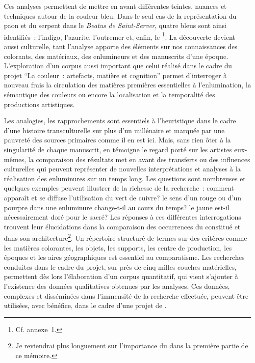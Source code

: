 Ces analyses permettent de mettre en avant différentes teintes, nuances et techniques autour de la couleur bleu. Dans le seul cas de la représentation du paon et du serpent dans le \textit{Beatus de Saint-Server}, quatre bleus sont ainsi identifiés~: l’indigo, l’azurite, l’outremer et, enfin, le \footnote{Cf. annexe 1.}. La découverte devient aussi culturelle, tant l’analyse apporte des éléments sur nos connaissances des colorants, des matériaux, des enlumineurs et des manuscrits d’une époque. L’exploration d’un corpus aussi important que celui réalisé dans le cadre du projet \enquote{La couleur~: artefacts, matière et cognition} permet d’interroger à nouveau frais la circulation des matières premières essentielles à l’enlumination, la sémantique des couleurs ou encore la localisation et la temporalité des productions artistiques. \par
Les analogies, les rapprochements sont essentiels à l’heuristique dans le cadre d’une histoire transculturelle sur plus d’un millénaire et marquée par une pauvreté des sources primaires comme il en est ici. Mais, sans rien ôter à la singularité de chaque manuscrit, en témoigne le regard porté sur les artistes eux-mêmes, la comparaison des résultats met en avant des transferts ou des influences culturelles qui peuvent représenter de nouvelles interprétations et analyses à la réalisation des enluminures sur un temps long. Les questions sont nombreuses et quelques exemples peuvent illustrer de la richesse de la recherche : comment apparaît et se diffuse l’utilisation du vert de cuivre? le sens d’un rouge ou d’un pourpre dans une enluminure change-t-il au cours du temps? le jaune est-il nécessairement doré pour le sacré? Les réponses à ces différentes interrogations trouvent leur élucidations dans la comparaison des occurrences du  constitué et dans son architecture\footnote{Je reviendrai plus longuement sur l’importance du  dans la première partie de ce mémoire.}. Un répertoire structuré de termes sur des critères comme les matières colorantes, les objets, les supports, les centre de production, les époques et les aires géographiques est essentiel au comparatisme. Les recherches conduites dans le cadre du projet, sur près de cinq milles couches matérielles, permettent dès lors l’élaboration d’un corpus quantitatif, qui vient s’ajouter à l’existence des données qualitatives obtenues par les analyses. Ces données, complexes et disséminées dans l’immensité de la recherche effectuée, peuvent être utilisées, avec bénéfice, dans le cadre d’une projet de .

